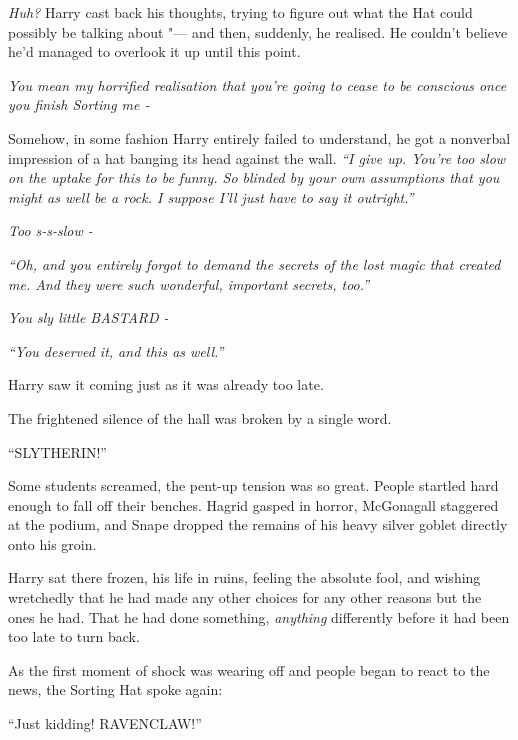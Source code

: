 \emph{Huh?} Harry cast back his thoughts, trying to figure out what the
Hat could possibly be talking about "--- and then, suddenly, he realised.
He couldn't believe he'd managed to overlook it up until this point.

\emph{You mean my horrified realisation that you're going to cease to be
conscious once you finish Sorting me -}

Somehow, in some fashion Harry entirely failed to understand, he got a
nonverbal impression of a hat banging its head against the wall.
\emph{``I give up. You're too slow on the uptake for this to be funny.
So blinded by your own assumptions that you might as well be a rock. I
suppose I'll just have to say it outright.''}

\emph{Too s-s-slow -}

\emph{``Oh, and you entirely forgot to demand the secrets of the lost
magic that created me. And they were such wonderful, important secrets,
too.''}

\emph{You sly little BASTARD -}

\emph{``You deserved it, and this as well.''}

Harry saw it coming just as it was already too late.

The frightened silence of the hall was broken by a single word.

``SLYTHERIN!''

Some students screamed, the pent-up tension was so great. People
startled hard enough to fall off their benches. Hagrid gasped in horror,
McGonagall staggered at the podium, and Snape dropped the remains of his
heavy silver goblet directly onto his groin.

Harry sat there frozen, his life in ruins, feeling the absolute fool,
and wishing wretchedly that he had made any other choices for any other
reasons but the ones he had. That he had done something, \emph{anything}
differently before it had been too late to turn back.

As the first moment of shock was wearing off and people began to react
to the news, the Sorting Hat spoke again:

``Just kidding! RAVENCLAW!''
